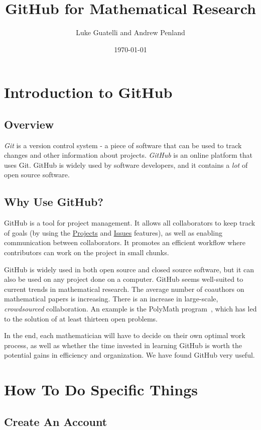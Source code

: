 \documentclass[11pt]{article}
\title{GitHub for Mathematical Research}
\author{Luke Guatelli and Andrew Penland}
\date{\today}
\begin{document}
\maketitle

\section{Introduction to GitHub}

\subsection{Overview}

\textit{Git} is a version control system - a piece of software that can be used to track changes and other information about projects. \textit{GitHub} is an online platform that uses Git. GitHub is widely used by software developers, and it contains a \textit{lot} of open source software. 

\subsection{Why Use GitHub?}

GitHub is a tool for project management. It allows all collaborators to keep track of goals (by using the \hyperlink{proj-section}{Projects} and \hyperlink{issues-section}{Issues} features), as well as enabling communication between collaborators. It promotes an efficient workflow where contributors can work on the project in small chunks.

GitHub is widely used in both open source and closed source software, but it can also be used on any project done on a computer.  GitHub seems well-suited to current trends in mathematical research. The average number of coauthors on mathematical papers is increasing. There is an increase in large-scale, \textit{crowdsourced} collaboration. An example is the PolyMath program~\cite{polymath-blog}, which has led to the solution of at least thirteen open problems. 

In the end, each mathematician will have to decide on their own optimal work process, as well as whether the time invested in learning GitHub is worth the potential gains in efficiency and organization. We have found GitHub very useful. 

\section{How To Do Specific Things}
\subsection{Create An Account}
\end{document}
